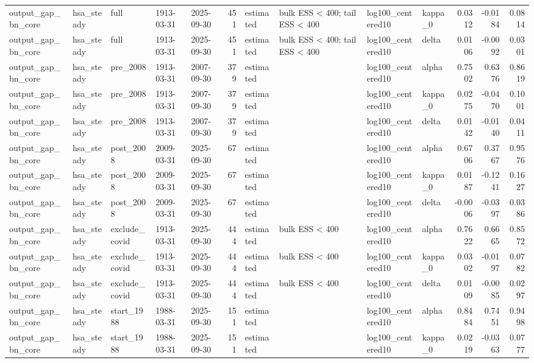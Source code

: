 \begin{tabular}{lllllrllllrrr}
output\_gap\_bn\_core & hsa\_steady & full & 1913-03-31 & 2025-09-30 & 451 & estimated & bulk ESS < 400; tail ESS < 400 & log100\_centered10 & kappa\_0 & 0.0312 & -0.0184 & 0.0814 \\
output\_gap\_bn\_core & hsa\_steady & full & 1913-03-31 & 2025-09-30 & 451 & estimated & bulk ESS < 400; tail ESS < 400 & log100\_centered10 & delta & 0.0106 & -0.0092 & 0.0301 \\
output\_gap\_bn\_core & hsa\_steady & pre\_2008 & 1913-03-31 & 2007-09-30 & 379 & estimated &  & log100\_centered10 & alpha & 0.7502 & 0.6376 & 0.8619 \\
output\_gap\_bn\_core & hsa\_steady & pre\_2008 & 1913-03-31 & 2007-09-30 & 379 & estimated &  & log100\_centered10 & kappa\_0 & 0.0275 & -0.0470 & 0.1001 \\
output\_gap\_bn\_core & hsa\_steady & pre\_2008 & 1913-03-31 & 2007-09-30 & 379 & estimated &  & log100\_centered10 & delta & 0.0142 & -0.0140 & 0.0411 \\
output\_gap\_bn\_core & hsa\_steady & post\_2008 & 2009-03-31 & 2025-09-30 & 67 & estimated &  & log100\_centered10 & alpha & 0.6706 & 0.3767 & 0.9576 \\
output\_gap\_bn\_core & hsa\_steady & post\_2008 & 2009-03-31 & 2025-09-30 & 67 & estimated &  & log100\_centered10 & kappa\_0 & 0.0187 & -0.1241 & 0.1627 \\
output\_gap\_bn\_core & hsa\_steady & post\_2008 & 2009-03-31 & 2025-09-30 & 67 & estimated &  & log100\_centered10 & delta & -0.0006 & -0.0397 & 0.0386 \\
output\_gap\_bn\_core & hsa\_steady & exclude\_covid & 1913-03-31 & 2025-09-30 & 444 & estimated & bulk ESS < 400 & log100\_centered10 & alpha & 0.7622 & 0.6665 & 0.8572 \\
output\_gap\_bn\_core & hsa\_steady & exclude\_covid & 1913-03-31 & 2025-09-30 & 444 & estimated & bulk ESS < 400 & log100\_centered10 & kappa\_0 & 0.0302 & -0.0197 & 0.0782 \\
output\_gap\_bn\_core & hsa\_steady & exclude\_covid & 1913-03-31 & 2025-09-30 & 444 & estimated & bulk ESS < 400 & log100\_centered10 & delta & 0.0109 & -0.0085 & 0.0297 \\
output\_gap\_bn\_core & hsa\_steady & start\_1988 & 1988-03-31 & 2025-09-30 & 151 & estimated &  & log100\_centered10 & alpha & 0.8484 & 0.7451 & 0.9498 \\
output\_gap\_bn\_core & hsa\_steady & start\_1988 & 1988-03-31 & 2025-09-30 & 151 & estimated &  & log100\_centered10 & kappa\_0 & 0.0219 & -0.0363 & 0.0777 \\

\end{tabular}
